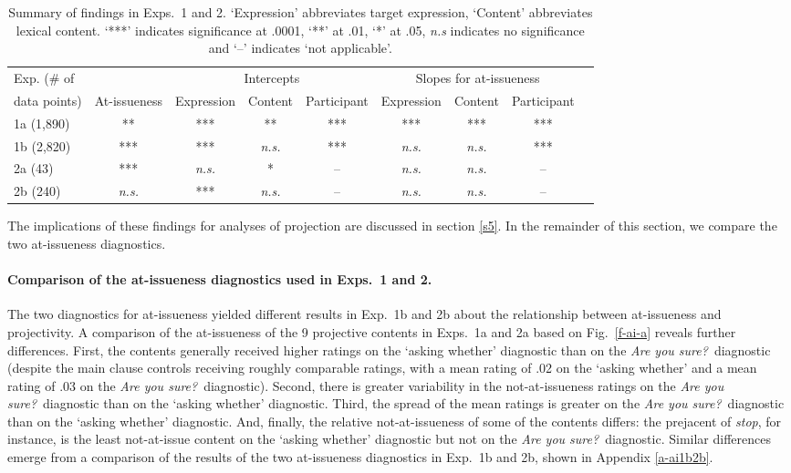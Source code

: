 \documentclass[11pt,fleqn]{article}
\newcommand{\6}{\mbox{$[\hspace*{-.6mm}[$}}
\newcommand{\9}{\mbox{$]\hspace*{-.6mm}]$}}
\newcommand{\figref}[1]{Fig.~\ref{#1}}
\begin{document}
\begin{table}[h!]

\begin{center}
\begin{tabular}{p{1.8cm} | c | c c c | c c c c}
\toprule
Exp. (\# of  & & \multicolumn{3}{c|}{Intercepts} & \multicolumn{3}{c}{Slopes for at-issueness}\\
data points) & At-issueness & Expression & Content & Participant & Expression & Content & Participant\\
\midrule
1a (1,890) & ** & *** & ** & *** & *** & *** & ***  \\ 

1b (2,820) & *** & *** & \emph{n.s.} &  *** & \emph{n.s.} & \emph{n.s.} & *** \\ 

2a (43) & *** & \emph{n.s.} & * & -- & \emph{n.s.} & \emph{n.s.} & -- \\ 

2b (240) & \emph{n.s.} & *** & \emph{n.s.} & --& \emph{n.s.} & \emph{n.s.} & -- \\ 
\bottomrule
\end{tabular}
\end{center}
\caption{Summary of findings in Exps.~1 and 2. `Expression' abbreviates target expression, `Content' abbreviates lexical content. `***' indicates significance at .0001, `**' at .01, `*' at .05, \emph{n.s} indicates no significance and `--' indicates `not applicable'.}\label{t-summary}
\end{table}

The implications of these findings for analyses of projection are discussed in section \ref{s5}. In the remainder of this section, we compare the two at-issueness diagnostics. 

\paragraph{Comparison of the at-issueness diagnostics used in Exps.~1 and 2.} The two diagnostics for at-issueness yielded different results in Exp.~1b and 2b about the relationship between at-issueness and projectivity. A comparison of the at-issueness of the 9 projective contents in Exps.~1a and 2a based on \figref{f-ai-a} reveals further differences. First, the contents generally received higher ratings on the `asking whether' diagnostic than on the {\em Are you sure?}~diagnostic (despite the main clause controls receiving roughly comparable ratings, with a mean rating of .02 on the `asking whether' and a mean rating of .03 on the {\em Are you sure?}~diagnostic). Second, there is greater variability in the not-at-issueness ratings on the {\em Are you sure?}~diagnostic  than on the `asking whether' diagnostic. Third, the spread of the mean ratings is greater on the {\em Are you sure?}~diagnostic than on the `asking whether' diagnostic. And, finally, the relative not-at-issueness of some of the contents differs: the prejacent of {\em stop}, for instance, is the least not-at-issue content on the `asking whether' diagnostic but not on the {\em Are you sure?}~diagnostic. Similar differences emerge from a comparison of the results of the two at-issueness diagnostics in Exp.~1b and 2b, shown in Appendix \ref{a-ai1b2b}. 
\end{document}
